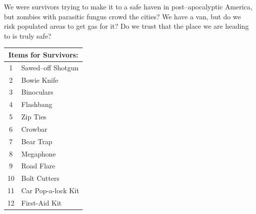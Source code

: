 \documentclass[a4,landscape]{book}
\begin{document}
\begin{multicols*}{4}
We were survivors trying to make it to a safe haven in post--apocalyptic America, but zombies with parasitic fungus crowd the cities?
We have a van, but do we risk populated areas to get gas for it?
Do we trust that the place we are heading to is truly safe? 
\begin{center}
  \begin{tabular}[ht]{|c|l|}
    \hline \multicolumn{2}{|c|}{Items for Survivors:} \\
    \hline 1 & Sawed--off Shotgun \\
    2 & Bowie Knife \\
    3 & Binoculars \\
    4 & Flashbang \\
    5 & Zip Ties \\
    6 & Crowbar \\
    7 & Bear Trap \\
    8 & Megaphone \\
    9 & Road Flare \\
    10 & Bolt Cutters \\
    11 & Car Pop-a-lock Kit \\
    12 & First-Aid Kit \\ \hline
  \end{tabular}
\end{center}


\end{multicols*}
\end{document}
